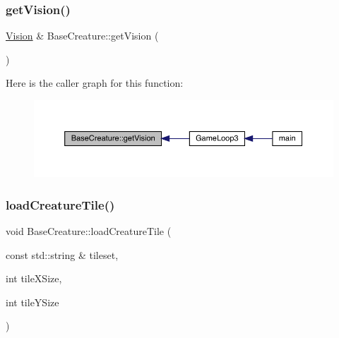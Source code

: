\subsubsection{\texorpdfstring{get\+Vision()}{getVision()}}
{\footnotesize\ttfamily \mbox{\hyperlink{class_vision}{Vision}} \& Base\+Creature\+::get\+Vision (\begin{DoxyParamCaption}{ }\end{DoxyParamCaption})}

Here is the caller graph for this function\+:
\nopagebreak
\begin{figure}[H]
\begin{center}
\leavevmode
\includegraphics[width=350pt]{class_base_creature_a8a960bc7a7689f5633b1abaa82fa6e95_icgraph}
\end{center}
\end{figure}
\mbox{\label{class_base_creature_af2066b8eb62bf595d30feae6671e4495}} 
\subsubsection{\texorpdfstring{load\+Creature\+Tile()}{loadCreatureTile()}}
{\footnotesize\ttfamily void Base\+Creature\+::load\+Creature\+Tile (\begin{DoxyParamCaption}\item[{const std\+::string \&}]{tileset,  }\item[{int}]{tile\+X\+Size,  }\item[{int}]{tile\+Y\+Size }\end{DoxyParamCaption})}

